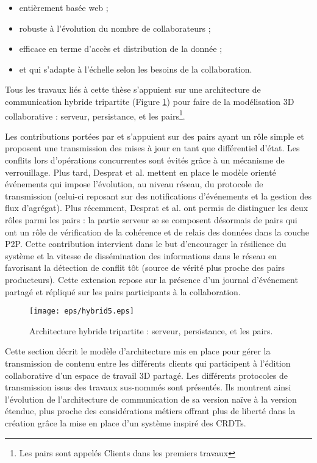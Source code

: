 \begin{itemize}
	\item entièrement basée web ; 
	\item robuste à l'évolution du nombre de collaborateurs ; 
	\item efficace en terme d'accès et distribution de la donnée ; 
	\item et qui s'adapte à l'échelle selon les besoins de la collaboration.
\end{itemize}


Tous les travaux liés à cette thèse 
\cite{Desprat2015a,Desprat2015b,Desprat2016,Desprat2017} s'appuient sur une 
architecture de communication hybride tripartite (Figure \ref{fig:hybrid}) pour 
faire de la modélisation \gls{3D} collaborative : serveur, persistance, 
et les pairs\footnote{Les pairs sont appelés \og Clients\fg{} dans les premiers 
travaux}. 

Les contributions portées par \cite{Desprat2015a} et \cite{Desprat2015b} 
s'appuient sur des pairs ayant un rôle simple et proposent une transmission des 
mises à jour en tant que différentiel d'état. Les conflits lors d'opérations 
concurrentes sont évités grâce à un mécanisme de verrouillage. 
Plus tard, Desprat et al.  \cite{Desprat2016} mettent en place le modèle orienté événements qui impose 
l'évolution, au niveau réseau, du protocole de transmission (celui-ci reposant sur 
des notifications d'événements et la gestion des flux d'agrégat). 
Plus récemment, Desprat et al. \cite{Desprat2017} ont permis de distinguer les deux rôles parmi les pairs : la 
partie serveur se se composent désormais de pairs qui ont un rôle de vérification 
de la cohérence et de relais des données dans la couche \gls{P2P}. Cette 
contribution intervient dans le but d'encourager la résilience du système et la 
vitesse de dissémination des informations dans le réseau en favorisant la 
détection de conflit tôt (source de vérité plus proche des pairs producteurs). 
Cette extension repose sur la présence d'un journal d'événement partagé et 
répliqué sur les pairs participants à la collaboration.

\begin{figure}[h!]
	\centering
	\texttt{[image: eps/hybrid5.eps]}
	\caption{Architecture hybride tripartite : serveur, persistance, 
		et les pairs.}
	\label{fig:hybrid}
\end{figure}

Cette section décrit le modèle d'architecture mis en 
place pour gérer la transmission de contenu entre les différents clients 
qui participent à l'édition collaborative d'un espace de travail \gls{3D} partagé. 
Les différents protocoles de transmission issus des travaux sus-nommés 
sont présentés. Ils montrent ainsi l'évolution de l'architecture de communication de 
sa version naïve à la version étendue, plus proche des considérations métiers 
offrant plus de liberté dans la création grâce la mise en place d'un système inspiré 
des \glspl{CRDT}.
 
